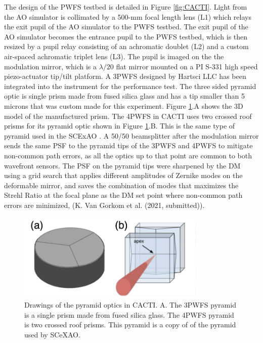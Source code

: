 The design of the PWFS testbed is detailed in Figure \ref{fig:CACTI}. Light from the AO simulator is collimated by a 500-mm focal length lens (L1) which relays the exit pupil of the AO simulator to the PWFS testbed. The exit pupil of the AO simulator becomes the entrance pupil to the PWFS testbed, which is then resized by a pupil relay consisting of an achromatic doublet (L2) and a custom air-spaced achromatic triplet lens (L3). The pupil is imaged on the the modulation mirror, which is a $\lambda/20$ flat mirror mounted on a PI S-331 high speed piezo-actuator tip/tilt platform. A 3PWFS designed by Hartsci LLC has been integrated into the instrument for the performance test. The three sided pyramid optic is single prism made from fused silica glass and has a tip smaller than 5 microns that was custom made for this experiment. Figure \ref{fig:pyramidOptics}.A shows the 3D model of the manufactured prism. The 4PWFS in CACTI uses two crossed roof prisms for its pyramid optic shown in Figure \ref{fig:pyramidOptics}.B. This is the same type of pyramid used in the SCExAO \citep{jovanovic2015subaru}.  A 50/50 beamsplitter after the modulation mirror sends the same PSF to the pyramid tips of the 3PWFS and 4PWFS to mitigate non-common path errors, as all the optics up to that point are common to both wavefront sensors. The PSF on the pyramid tips were sharpened by the DM using a grid search that applies different amplitudes of Zernike modes on the deformable mirror, and saves the combination of modes that maximizes the Strehl Ratio at the focal plane as the  DM set point where non-common path errors are minimized, (K. Van Gorkom et al. (2021, submitted)).

\begin{figure}
    \centering
    \includegraphics[width=0.8\textwidth]{Chapter Materials/Chapter Five Materials/pyramidOptics.png}
    \caption{Drawings of the pyramid optics in CACTI. A. The 3PWFS pyramid is a single prism made from fused silica glass. The 4PWFS pyramid is two crossed roof prisms. This pyramid is a copy of of the pyramid used by SCeXAO. }
    \label{fig:pyramidOptics}
\end{figure}


